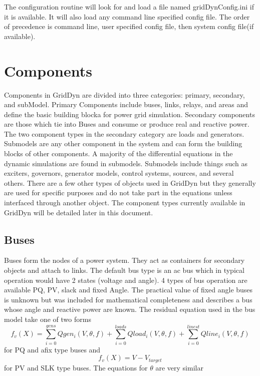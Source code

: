 \documentclass[12pt]{article} %
\begin{document}
The configuration routine will look for and load a file named gridDynConfig.ini if it is available.  It will also load any command line specified config file.  The order of precedence is command line, user specified config file, then system config file(if available).



\section{Components}
Components in GridDyn are divided into three categories:  primary, secondary, and subModel.  Primary Components include buses, links, relays, and areas and define the basic building blocka for power grid simulation.  Secondary components are those which tie into Buses and consume or produce real and reactive power.  The two component types in the secondary category are loads and generators.  Submodels are any other component in the system and can form the building blocks of other components.  A majority of the differential equations in the dynamic simulations are found in submodels.  Submodels include things such as exciters, governors, generator models, control systems,  sources,  and several others.  There are a few other types of objects used in GridDyn but they generally are used for specific purposes and do not take part in the equations unless interfaced through another object.  The component types currently available in GridDyn will be detailed later in this document.

\subsection{Buses}
Buses form the nodes of a power system.  They act as containers for secondary objects and attach to links.   The default bus type is an ac bus which in typical operation would have 2 states (voltage and angle).  4 types of bus operation are available PQ, PV, slack and fixed Angle.  The practical value of fixed angle buses is unknown but was included for mathematical completeness and describes a bus whose angle and reactive power are known.  The residual equation used in the bus model take one of two forms
\begin{equation}
f_v(X)=\sum_{i=0}^{gens}Qgen_i(V,\theta,f)+\sum_{i=0}^{loads}Qload_i(V,\theta,f)+\sum_{i=0}^{linest}Qline_i(V,\theta,f)
\end{equation}
for PQ and afix type buses and
\begin{equation}
f_v(X)=V-V_{target}
\end{equation}
for PV and SLK type buses.
The equations for $\theta$ are very similar
\end{document}
